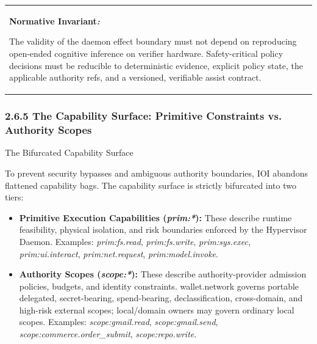 \documentclass[
  11pt,
]{article}
\providecommand{\tightlist}{%
  \setlength{\itemsep}{0pt}\setlength{\parskip}{0pt}}
\begin{document}
\begin{longtable}[]{@{}
  >{\raggedright\arraybackslash}p{}@{}}
\toprule\noalign{}
 \\
\midrule\noalign{}
\endhead
\bottomrule\noalign{}
\endlastfoot
\textbf{Normative Invariant}\emph{\textbf{:}}

The validity of the daemon effect boundary must not depend on
reproducing open-ended cognitive inference on verifier hardware.
Safety-critical policy decisions must be reducible to deterministic evidence,
explicit policy state, the applicable authority refs, and a versioned,
verifiable assist contract. \\
\end{longtable}

\hypertarget{the-capability-surface-primitive-constraints-vs.-authority-scopes}{%
\subsubsection{2.6.5 The Capability Surface: Primitive Constraints vs.
Authority
Scopes}\label{the-capability-surface-primitive-constraints-vs.-authority-scopes}}

The Bifurcated Capability Surface

To prevent security bypasses and ambiguous authority boundaries, IOI abandons
flattened capability bags. The capability surface is strictly bifurcated
into two tiers:

\begin{itemize}
\tightlist
\item
  \textbf{Primitive Execution Capabilities
  (}\emph{\textbf{prim:*}}\textbf{):} These describe runtime
  feasibility, physical isolation, and risk boundaries enforced by the
  Hypervisor Daemon. Examples: \emph{prim:fs.read},
  \emph{prim:fs.write}, \emph{prim:sys.exec}, \emph{prim:ui.interact},
  \emph{prim:net.request}, \emph{prim:model.invoke}.
\item
  \textbf{Authority Scopes (}\emph{\textbf{scope:*}}\textbf{):} These
  describe authority-provider admission policies, budgets, and identity
  constraints. wallet.network governs portable delegated, secret-bearing,
  spend-bearing, declassification, cross-domain, and high-risk external
  scopes; local/domain owners may govern ordinary local scopes. Examples:
  \emph{scope:gmail.read}, \emph{scope:gmail.send},
  \emph{scope:commerce.order\_submit}, \emph{scope:repo.write}.
\end{itemize}
\end{document}
